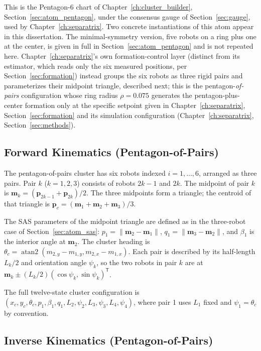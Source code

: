 \documentclass[12pt, letterpaper, oneside]{report}
\begin{document}
This is the Pentagon-6 chart of Chapter~\ref{ch:cluster_builder},
Section~\ref{sec:atom_pentagon}, under the consensus gauge of
Section~\ref{sec:gauge}, used by Chapter~\ref{ch:separatrix}. Two
concrete instantiations of this atom appear in this dissertation. The
minimal-symmetry version, five robots on a ring plus one at the center,
is given in full in Section~\ref{sec:atom_pentagon} and is not repeated
here. Chapter~\ref{ch:separatrix}'s own formation-control layer
(distinct from its estimator, which reads only the six measured
positions, per Section~\ref{sec:formation}) instead groups the six
robots as three rigid pairs and parameterizes their midpoint triangle,
described next; this is the pentagon-\emph{of-pairs} configuration
whose ring radius $\rho=0.075$ generates the pentagon-plus-center
formation only at the specific setpoint given in
Chapter~\ref{ch:separatrix}, Section~\ref{sec:formation} and its
simulation configuration (Chapter~\ref{ch:separatrix},
Section~\ref{sec:methods}).

\subsection{Forward Kinematics (Pentagon-of-Pairs)}

The pentagon-of-pairs cluster has six robots indexed $i=1,\ldots,6$,
arranged as three pairs. Pair $k$ ($k=1,2,3$) consists of robots
$2k-1$ and $2k$. The midpoint of pair $k$ is
$\mathbf{m}_k=(\mathbf{p}_{2k-1}+\mathbf{p}_{2k})/2$. The three
midpoints form a triangle; the centroid of that triangle is
$\mathbf{p}_c=(\mathbf{m}_1+\mathbf{m}_2+\mathbf{m}_3)/3$.

The SAS parameters of the midpoint triangle are defined as in the
three-robot case of Section~\ref{sec:atom_sas}: $p_1=\lVert\mathbf{m}_2-\mathbf{m}_1\rVert$,
$q_1=\lVert\mathbf{m}_3-\mathbf{m}_2\rVert$, and $\beta_1$ is the
interior angle at $\mathbf{m}_2$. The cluster heading is
$\theta_c=\operatorname{atan2}(m_{2,y}-m_{1,y},m_{2,x}-m_{1,x})$. Each
pair is described by its half-length $L_k/2$ and orientation angle
$\psi_k$, so the two robots in pair $k$ are at
$\mathbf{m}_k\pm(L_k/2)(\cos\psi_k,\sin\psi_k)^{\mathsf T}$.

The full twelve-state cluster configuration is
$(x_c,y_c,\theta_c,p_1,\beta_1,q_1,L_2,\psi_2,L_3,\psi_3,L_4,\psi_4)$,
where pair 1 uses $L_1$ fixed and $\psi_1=\theta_c$ by convention.

\subsection{Inverse Kinematics (Pentagon-of-Pairs)}
\end{document}
